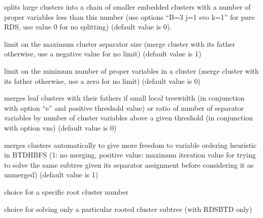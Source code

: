 \documentclass[letterpaper,10pt,openany,oneside,english]{sphinxmanual}
\begin{document}
\begin{description}
\sphinxAtStartPar
splits large clusters into a chain of smaller embedded clusters with a number of proper variables less than this number (use options “\sphinxhyphen{}B=3 \sphinxhyphen{}j=1 \sphinxhyphen{}svo \sphinxhyphen{}k=1” for pure RDS, use value 0 for no splitting) (default value is 0).

\sphinxAtStartPar
limit on the maximum cluster separator size (merge cluster with its father otherwise, use a negative value for no limit) (default value is \sphinxhyphen{}1)

\sphinxAtStartPar
limit on the minimum number of proper variables in a cluster (merge cluster with its father otherwise, use a zero for no limit) (default value is 0)

\sphinxAtStartPar
merges leaf clusters with their fathers if small local treewidth (in conjunction with option “\sphinxhyphen{}e” and positive threshold value) or ratio of number of separator variables by number of cluster variables above a given threshold (in conjunction with option \sphinxhyphen{}vns) (default value is 0)

\sphinxAtStartPar
merges clusters automatically to give more freedom to variable ordering heuristic in BTD\sphinxhyphen{}HBFS
(\sphinxhyphen{}1: no merging, positive value: maximum iteration value for trying to solve the same subtree given its separator assignment before considering it as unmerged) (default value is \sphinxhyphen{}1)

\sphinxAtStartPar
choice for a specific root cluster number

\sphinxAtStartPar
choice for solving only a particular rooted cluster subtree
(with RDS\sphinxhyphen{}BTD only)

\end{description}
\end{document}
